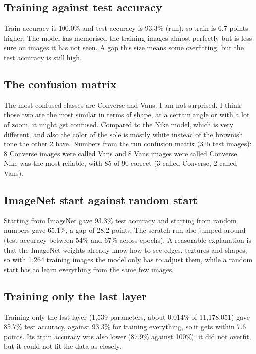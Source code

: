 \documentclass[11pt]{article}
\begin{document}
\subsection*{Training against test accuracy}
Train accuracy is 100.0\% and test accuracy is 93.3\% (run), so train is 6.7 points higher. The model has memorised the training images almost perfectly but is less sure on images it has not seen. A gap this size means some overfitting, but the test accuracy is still high.

\begin{center}\end{center}

\subsection*{The confusion matrix}
The most confused classes are Converse and Vans. I am not surprised. I think those two are the most similar in terms of shape, at a certain angle or with a lot of zoom, it might get confused. Compared to the Nike model, which is very different, and also the color of the sole is mostly white instead of the brownish tone the other 2 have. Numbers from the run confusion matrix (315 test images): 8 Converse images were called Vans and 8 Vans images were called Converse. Nike was the most reliable, with 85 of 90 correct (3 called Converse, 2 called Vans).

\subsection*{ImageNet start against random start}
Starting from ImageNet gave 93.3\% test accuracy and starting from random numbers gave 65.1\%, a gap of 28.2 points. The scratch run also jumped around (test accuracy between 54\% and 67\% across epochs). A reasonable explanation is that the ImageNet weights already know how to see edges, textures and shapes, so with 1,264 training images the model only has to adjust them, while a random start has to learn everything from the same few images.

\subsection*{Training only the last layer}
Training only the last layer (1,539 parameters, about 0.014\% of 11,178,051) gave 85.7\% test accuracy, against 93.3\% for training everything, so it gets within 7.6 points. Its train accuracy was also lower (87.9\% against 100\%): it did not overfit, but it could not fit the data as closely.
\end{document}

